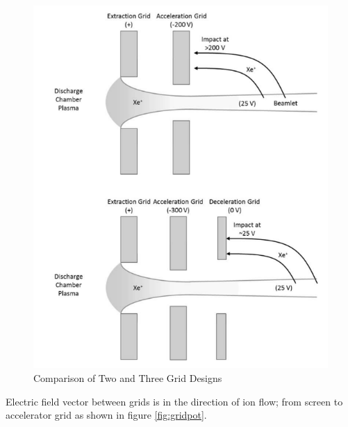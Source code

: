\begin{figure}[ht]
    \centering
    \includegraphics[scale=0.75]{fig/ionbackstreamdecel.png}
    \caption[Comparison of Two and Three Grid Designs]{Comparison of Two and Three Grid Designs\cite{Couch2017}}
    \label{fig:ionbackstreamdecel}
\end{figure}

Electric field vector between grids is in the direction of ion flow; from screen to accelerator grid as shown in figure \ref{fig:gridpot}. 

